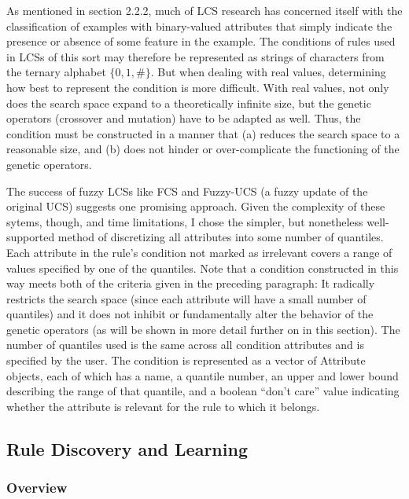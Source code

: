 \documentclass[12pt]{article}
\begin{document}
As mentioned in section 2.2.2, much of LCS research has concerned itself with the classification of examples with binary-valued attributes that simply indicate the presence or absence of some feature in the example. The conditions of rules used in LCSs of this sort may therefore be represented as strings of characters from the ternary alphabet $\{0,1,\#\}$. But when dealing with real values, determining how best to represent the condition is more difficult. With real values, not only does the search space expand to a theoretically infinite size, but the genetic operators (crossover and mutation) have to be adapted as well. Thus, the condition must be constructed in a manner that (a) reduces the search space to a reasonable size, and (b) does not hinder or over-complicate the functioning of the genetic operators.

The success of fuzzy LCSs like FCS \cite{manuel_valenzuela-rendon_fuzzy_1991} and Fuzzy-UCS \cite{orriols-puig_fuzzy-ucs:_2009} (a fuzzy update of the original UCS) suggests one promising approach. Given the complexity of these sytems, though, and time limitations, I chose the simpler, but nonetheless well-supported method of discretizing all attributes into some number of quantiles. Each attribute in the rule's condition not marked as irrelevant covers a range of values specified by one of the quantiles. Note that a condition constructed in this way meets both of the criteria given in the preceding paragraph: It radically restricts the search space (since each attribute will have a small number of quantiles) and it does not inhibit or fundamentally alter the behavior of the genetic operators (as will be shown in more detail further on in this section). The number of quantiles used is the same across all condition attributes and is specified by the user. The condition is represented as a vector of Attribute objects, each of which has a name, a quantile number, an upper and lower bound describing the range of that quantile, and a boolean ``don't care'' value indicating whether the attribute is relevant for the rule to which it belongs.

\subsection{Rule Discovery and Learning}

\subsubsection{Overview}
\end{document}
